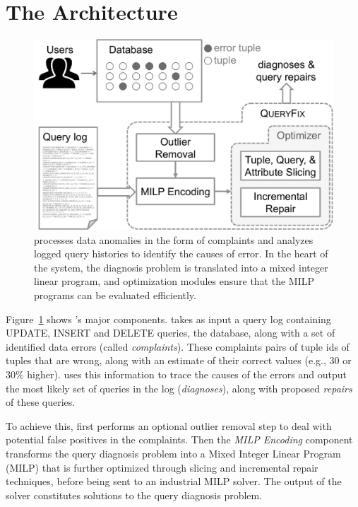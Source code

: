 \section{The {\large\textbf{\sys}} Architecture}

\begin{figure}[h]
    \centering
        \includegraphics[scale=0.35]{figures/architecture}
    \caption{\sys processes data anomalies in the form of complaints and analyzes logged query histories to identify the causes of error. 
    In the heart of the system, the diagnosis problem is translated into a mixed integer linear program, and optimization modules ensure that the MILP programs can be evaluated efficiently.}
    \label{fig:architecture}
\end{figure}


Figure~\ref{fig:architecture} shows \sys's major components.  \sys takes as input 
a query log containing UPDATE, INSERT and DELETE queries, the database, along with a
set of identified data errors (called {\it complaints}).  These complaints pairs
of tuple ids of tuples that are wrong, along with an estimate of their correct values (e.g., $30$ or $30\%$ higher).
\sys uses this information to trace the causes of the errors and output the most likely set of 
queries in the log ({\it diagnoses}), along with proposed {\it repairs} of these queries.

To achieve this, \sys first performs an optional outlier removal step to deal with potential
false positives in the complaints.  Then the {\it MILP Encoding} component transforms the
query diagnosis problem into a Mixed Integer Linear Program (MILP) that is further optimized
through slicing and incremental repair techniques, before being sent
to an industrial MILP solver.  The output of the solver constitutes solutions to the query diagnosis
problem.

